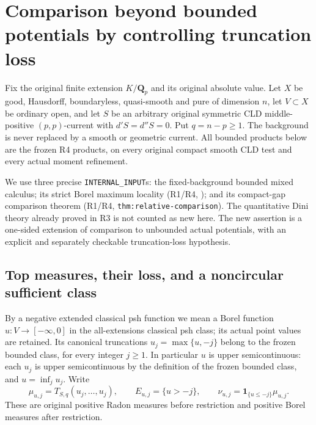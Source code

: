 \documentclass[11pt,a4paper]{article}
\numberwithin{equation}{section}
\theoremstyle{definition}
\theoremstyle{remark}
\begin{document}


\section{Comparison beyond bounded potentials by controlling truncation loss}
\label{sec:r11-unbounded-comparison}

Fix the original finite extension $K/\mathbf Q_p$ and its original
absolute value. Let $X$ be good, Hausdorff, boundaryless, quasi-smooth
and pure of dimension $n$, let $V\subset X$ be ordinary open, and
let $S$ be an arbitrary original symmetric CLD middle-positive
$(p,p)$-current with $d'S=d''S=0$. Put $q=n-p\geq1$.
The background is never replaced by a smooth or geometric current.
All bounded products below are the frozen R4 products, on every
original compact smooth CLD test and every actual moment refinement.

We use three precise \texttt{INTERNAL\_INPUT}s: the fixed-background
bounded mixed calculus; its strict Borel maximum locality
(R1/R4, ); and its compact-gap
comparison theorem (R1/R4, \texttt{thm:relative-comparison}).
The quantitative Dini theory already proved in R3 is not counted as
new here. The new assertion is a one-sided extension of comparison
to unbounded actual potentials, with an explicit and separately
checkable truncation-loss hypothesis.

\subsection{Top measures, their loss, and a noncircular sufficient class}

By a negative extended classical psh function we mean a Borel function
$u:V\to[-\infty,0]$ in the all-extensions classical psh class;
its actual point values are retained. Its canonical truncations
$u_j=\max\{u,-j\}$ belong to the frozen bounded class, for every
integer $j\geq1$. In particular $u$ is upper semicontinuous:
each $u_j$ is upper semicontinuous by the definition of the frozen
bounded class, and $u=\inf_j u_j$. Write
\[
 \mu_{u,j}=T_{S,q}(u_j,\ldots,u_j),\qquad
 E_{u,j}=\{u>-j\},\qquad
 \nu_{u,j}=\mathbf1_{\{u\leq-j\}}\mu_{u,j}.
 \tag{UC1}
\]
These are original positive Radon measures before restriction and
positive Borel measures after restriction.
\end{document}
